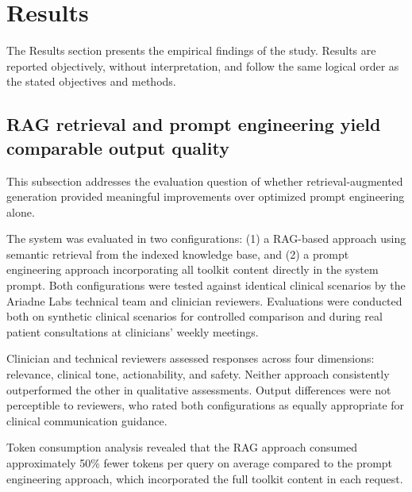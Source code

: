 \newpage
\section{Results}\label{sec:results}

The Results section presents the empirical findings of the study.
Results are reported objectively, without interpretation,
and follow the same logical order as the stated objectives and methods.


\subsection{RAG retrieval and prompt engineering yield comparable output quality}

This subsection addresses the evaluation question of whether retrieval-augmented generation provided meaningful improvements over optimized prompt engineering alone.

The system was evaluated in two configurations: (1) a RAG-based approach using semantic retrieval from the indexed knowledge base, and (2) a prompt engineering approach incorporating all toolkit content directly in the system prompt. Both configurations were tested against identical clinical scenarios by the Ariadne Labs technical team and clinician reviewers. Evaluations were conducted both on synthetic clinical scenarios for controlled comparison and during real patient consultations at clinicians' weekly meetings.

Clinician and technical reviewers assessed responses across four dimensions: relevance, clinical tone, actionability, and safety. Neither approach consistently outperformed the other in qualitative assessments. Output differences were not perceptible to reviewers, who rated both configurations as equally appropriate for clinical communication guidance.

Token consumption analysis revealed that the RAG approach consumed approximately 50\% fewer tokens per query on average compared to the prompt engineering approach, which incorporated the full toolkit content in each request.

